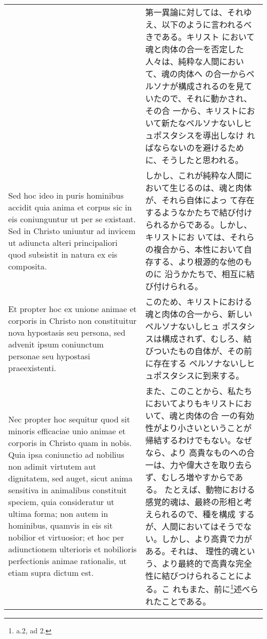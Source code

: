 \documentclass[10pt]{jsarticle} %
\begin{document}
\begin{longtable}{p{21em}p{21em}}
&


第一異論に対しては、それゆえ、以下のように言われるべきである。キリスト
において魂と肉体の合一を否定した人々は、純粋な人間において、魂の肉体へ
の合一からペルソナが構成されるのを見ていたので、それに動かされ、その合
一から、キリストにおいて新たなペルソナないしヒュポスタシスを導出しなけ
ればならないのを避けるために、そうしたと思われる。



\\

Sed hoc ideo in puris hominibus accidit quia anima et corpus sic in
eis coniunguntur ut per se existant. Sed in Christo uniuntur ad
invicem ut adiuncta alteri principaliori quod subsistit in natura ex
eis composita.


&

しかし、これが純粋な人間において生じるのは、魂と肉体が、それら自体によっ
て存在するようなかたちで結び付けられるからである。しかし、キリストにお
いては、それらの複合から、本性において自存する、より根源的な他のものに
沿うかたちで、相互に結び付けられる。

\\

Et propter hoc ex unione animae et corporis in Christo non
constituitur nova hypostasis seu persona, sed advenit ipsum coniunctum
personae seu hypostasi praeexistenti.


&

このため、キリストにおける魂と肉体の合一から、新しいペルソナないしヒュ
ポスタシスは構成されず、むしろ、結びついたもの自体が、その前に存在する
ペルソナないしヒュポスタシスに到来する。

\\

Nec propter hoc sequitur quod sit minoris efficaciae unio animae et
corporis in Christo quam in nobis. Quia ipsa coniunctio ad nobilius
non adimit virtutem aut dignitatem, sed auget, sicut anima sensitiva
in animalibus constituit speciem, quia consideratur ut ultima forma;
non autem in hominibus, quamvis in eis sit nobilior et virtuosior; et
hoc per adiunctionem ulterioris et nobilioris perfectionis animae
rationalis, ut etiam supra dictum est.


&

また、このことから、私たちにおいてよりもキリストにおいて、魂と肉体の合
一の有効性がより小さいということが帰結するわけでもない。なぜなら、より
高貴なものへの合一は、力や偉大さを取り去らず、むしろ増やすからである。
たとえば、動物における感覚的魂は、最終の形相と考えられるので、種を構成
するが、人間においてはそうでない。しかし、より高貴で力がある。それは、
理性的魂という、より最終的で高貴な完全性に結びつけられることによる。こ
れもまた、前に\footnote{a.2, ad 2.}述べられたことである。


\end{longtable}
\end{document}
